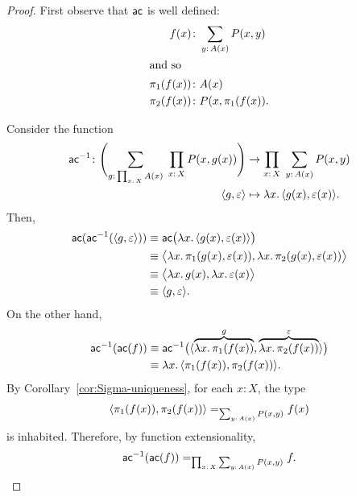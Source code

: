 \begin{proof}
    First observe that $\mathsf{ac}$ is well defined:
    \begin{align*}
        f(x)&\colon\sum_{y\colon A(x)}P(x,y)\\
    \intertext{and so}
        \pi_1(f(x))&\colon A(x)\\
        \pi_2(f(x))&\colon P(x,\pi_1(f(x)).
    \end{align*}
    
    Consider the function
    \begin{align*}
        \fun{ac}^{-1}\colon
            \Biggl(
                \sum_{g\colon\prod_{x\colon X}A(x)}\;
                    \prod_{x\colon X}P(x,g(x))
            \Biggr)
        &\to
            \prod_{x\colon X}\;\sum_{y\colon A(x)}P(x,y)\\
        \dep{g,\varepsilon}
            &\mapsto\lambda x.\,\dep{g(x),\varepsilon(x)}.
    \end{align*}
    Then,
    \begin{align*}
        \mathsf{ac}(\mathsf{ac}^{-1}(\langle g,\varepsilon\rangle))
            &\equiv\mathsf{ac}
                \bigl(
                    \lambda x.\,\langle g(x),\varepsilon(x)\rangle
                \bigr)\\
            &\equiv
                \bigl\langle
                    \lambda x.\,\pi_1(g(x),\varepsilon(x)),
                    \lambda x.\,\pi_2(g(x),\varepsilon(x))
                \bigr\rangle\\
            &\equiv
                \bigl\langle
                    \lambda x.\,g(x),\lambda x.\,\varepsilon(x)
                \bigr\rangle\\
            &\equiv\langle g,\varepsilon\rangle.
    \end{align*}
    On the other hand,
    \begin{align*}
        \mathsf{ac}^{-1}(\mathsf{ac}(f))
            &\equiv\mathsf{ac}^{-1}
                \bigl(
                    \langle
                        \overbrace{\lambda x.\,\pi_1(f(x))}^g,
                        \overbrace{\lambda x.\,\pi_2(f(x))}^\varepsilon
                    \rangle
                \bigr)\\
            &\equiv
                \lambda x.\,\langle\pi_1(f(x)),\pi_2(f(x))\rangle.
    \end{align*}
    By Corollary~\ref{cor:Sigma-uniqueness}, for each $x\colon X$, the type
    \[
        \dep{\pi_1(f(x)),\pi_2(f(x))}
        \eq{\sum_{y\colon A(x)}P(x,y)}f(x)
    \]
    is inhabited. Therefore, by function extensionality,
    \[
        \fun{ac}^{-1}(\fun{ac}(f))
            \eq{\prod_{x\colon X}\sum_{y\colon A(x)}P(x,y)}f.
    \]
\end{proof}

